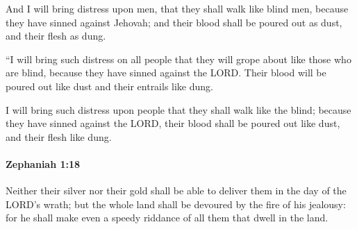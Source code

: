 			\begin{versebox}
					\item[BHS] 
					\item[LXX] 
					\item[ASV] And I will bring distress upon men, that they shall walk like blind men, because they have sinned against Jehovah; and their blood shall be poured out as dust, and their flesh as dung.
					\item[NIV] “I will bring such distress on all people that they will grope about like those who are blind, because they have sinned against the LORD. Their blood will be poured out like dust and their entrails like dung.
					\item[NRSV] I will bring such distress upon people that they shall walk like the blind; because they have sinned against the LORD, their blood shall be poured out like dust, and their flesh like dung.
			\end{versebox}

		\paragraph{Zephaniah 1:18} %
			\label{ZEPHANIAH-1-18}

			Neither their silver nor their gold shall be able to deliver them in the day of the LORD’s wrath; but the whole land shall be devoured by the fire of his jealousy: for he shall make even a speedy riddance of all them that dwell in the land.


